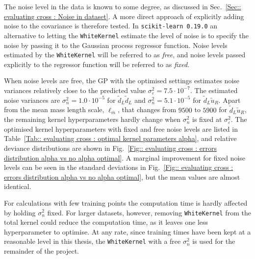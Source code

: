 \documentclass[twoside,english]{uiofysmaster}
\begin{document}
{{The noise level in the data is known to some degree, as discussed in Sec.~\ref{Sec:: evaluating cross : Noise in dataset}. A more direct approach of explicitly adding noise to the covariance is therefore tested. In \verb|scikit-learn 0.19.0| an alternative to letting the \verb|WhiteKernel| estimate the level of noise is to specify the noise by passing it to the Gaussian process regressor function. Noise levels estimated by the \verb|WhiteKernel| will be referred to as \textit{free}, and noise levels passed explicitly to the regressor function will be referred to as \textit{fixed}.

When noise levels are free, the GP with the optimised settings estimates noise variances relatively close to the predicted value $\sigma_{\varepsilon}^2 = 7.5 \cdot 10^{-7}$. The estimated noise variances are $\sigma_n^2=1.0 \cdot 10^{-5}$ for $\widetilde{d}_L \widetilde{d}_L$ and $\sigma_n^2= 5.1 \cdot 10^{-5}$ for $\widetilde{d}_L \widetilde{u}_R$. Apart from the mean mass length scale, $\ell_{\bar{m}}$, that changes from $9500$ to $5900$ for $\widetilde{d}_L \widetilde{u}_R$, the remaining kernel hyperparameters hardly change when $\sigma_n^2$ is fixed at $\sigma_{\varepsilon}^2$. The optimised kernel hyperparameters with fixed and free noise levels are listed in Table~\ref{Tab:: evaluating cross : optimal kernel parameters alpha}, and relative deviance distributions are shown in Fig.~\ref{Fig:: evaluating cross : errors distribution alpha vs no alpha optimal}. A marginal improvement for fixed noise levels can be seen in the standard deviations in Fig.~\ref{Fig:: evaluating cross : errors distribution alpha vs no alpha optimal}, but the mean values are almost identical.

For calculations with few training points the computation time is hardly affected by holding $\sigma_n^2$ fixed. For larger datasets, however, removing \verb|WhiteKernel| from the total kernel could reduce the computation time, as it leaves one less hyperparameter to optimise. At any rate, since training times have been kept at a reasonable level in this thesis, the \verb|WhiteKernel| with a free $\sigma_n^2$ is used for the remainder of the project.

}}
\end{document}

